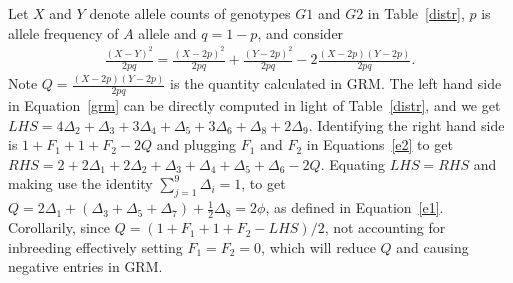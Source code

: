 \documentclass[11pt,Times]{article}
\begin{document}
Let $X$ and $Y$ denote allele counts of genotypes $G1$ and $G2$ in Table~\ref{distr}, $p$ is allele frequency of $A$ allele and $q=1-p$, and consider 
\begin{equation}\label{grm}
\begin{aligned}
\frac{(X-Y)^2}{2pq} = \frac{(X-2p)^2}{2pq} + \frac{(Y-2p)^2}{2pq} - 2 \frac{(X-2p) (Y-2p)}{2pq}.
\end{aligned}
\end{equation}
Note $Q = \frac{(X-2p) (Y-2p)}{2pq}$ is the quantity calculated in GRM. The left hand side in Equation~\eqref{grm} can be directly computed in light of Table~\ref{distr}, and we get $LHS=4\Delta_2 + \Delta_3 + 3\Delta_4 + \Delta_5 + 3\Delta_6 + \Delta_8 + 2\Delta_9$. Identifying the right hand side is $1+F_1 + 1+ F_2 -  2Q$ and plugging $F_1$ and $F_2$ in Equations~\eqref{e2} to get $RHS = 2 + 2\Delta_1 + 2\Delta_2 + \Delta_3+\Delta_4+\Delta_5+\Delta_6 - 2Q$. Equating $LHS = RHS$ and making use the identity $\sum_{j=1}^9\Delta_i = 1$, to get $Q = 2 \Delta_1 + (\Delta_3+\Delta_5+\Delta_7) + \frac{1}{2} \Delta_8 = 2\phi$, as defined in Equation~\eqref{e1}.   Corollarily, since $Q = (1+F_1 + 1 + F_2 - LHS)/ 2$, not accounting for inbreeding effectively setting $F_1=F_2=0$, which will reduce $Q$ and causing negative entries in GRM.  
  



\end{document}
